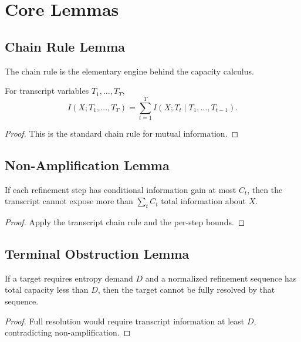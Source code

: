 \chapter{Core Lemmas}

\section{Chain Rule Lemma}

The chain rule is the elementary engine behind the capacity calculus.

\begin{lemma}
For transcript variables \(T_1,\ldots,T_T\),
\[
I(X;T_1,\ldots,T_T)
=
\sum_{t=1}^{T} I(X;T_t \mid T_1,\ldots,T_{t-1}) .
\]
\end{lemma}

\begin{proof}
This is the standard chain rule for mutual information.
\end{proof}

\section{Non-Amplification Lemma}

\begin{lemma}
If each refinement step has conditional information gain at most \(C_t\), then the transcript cannot expose more than \(\sum_t C_t\) total information about \(X\).
\end{lemma}

\begin{proof}
Apply the transcript chain rule and the per-step bounds.
\end{proof}

\section{Terminal Obstruction Lemma}

\begin{lemma}
If a target requires entropy demand \(D\) and a normalized refinement sequence has total capacity less than \(D\), then the target cannot be fully resolved by that sequence.
\end{lemma}

\begin{proof}
Full resolution would require transcript information at least \(D\), contradicting non-amplification.
\end{proof}
